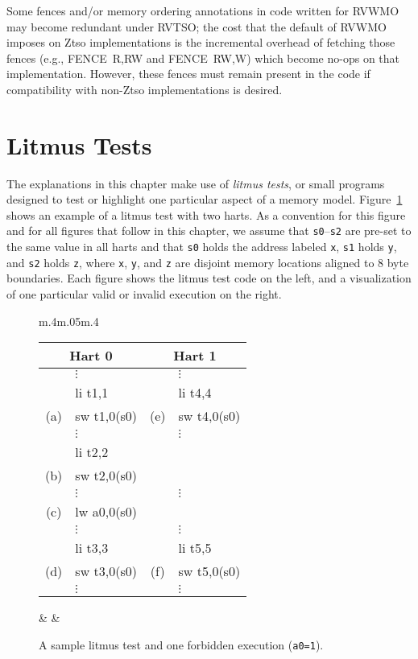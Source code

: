 Some fences and/or memory ordering annotations in code written for RVWMO may become redundant under RVTSO; the cost that the default of RVWMO imposes on Ztso implementations is the incremental overhead of fetching those fences (e.g., FENCE~R,RW and FENCE~RW,W) which become no-ops on that implementation.
However, these fences must remain present in the code if compatibility with non-Ztso implementations is desired.

\section{Litmus Tests}
The explanations in this chapter make use of {\em litmus tests}, or small programs designed to test or highlight one particular aspect of a memory model.
Figure~\ref{fig:litmus:sample} shows an example of a litmus test with two harts.
As a convention for this figure and for all figures that follow in this chapter, we assume that {\tt s0}--{\tt s2} are pre-set to the same value in all harts and that {\tt s0} holds the address labeled {\tt x}, {\tt s1} holds {\tt y}, and {\tt s2} holds {\tt z}, where {\tt x}, {\tt y}, and {\tt z} are disjoint memory locations aligned to 8 byte boundaries.
Each figure shows the litmus test code on the left, and a visualization of one particular valid or invalid execution on the right.

\begin{figure}[h!]
  \centering
    \begin{tabular}{m{.4\linewidth}m{.05\linewidth}m{.4\linewidth}}
    \tt\small
    \begin{tabular}{cl||cl}
    \multicolumn{2}{c}{Hart 0} & \multicolumn{2}{c}{Hart 1} \\
    \hline
          & $\vdots$    &     & $\vdots$    \\
          & li t1,1     &     & li t4,4     \\
      (a) & sw t1,0(s0) & (e) & sw t4,0(s0) \\
          & $\vdots$    &     & $\vdots$    \\
          & li t2,2     &     &             \\
      (b) & sw t2,0(s0) &     &             \\
          & $\vdots$    &     & $\vdots$    \\
      (c) & lw a0,0(s0) &     &             \\
          & $\vdots$    &     & $\vdots$    \\
          & li t3,3     &     & li t5,5     \\
      (d) & sw t3,0(s0) & (f) & sw t5,0(s0) \\
          & $\vdots$    &     & $\vdots$    \\
    \end{tabular}
    & &
    
\end{tabular}
    \caption{A sample litmus test and one forbidden execution ({\tt a0=1}).}
  \label{fig:litmus:sample}
\end{figure}

